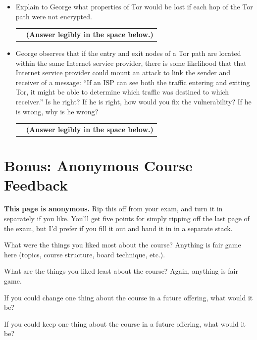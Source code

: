 \documentclass[11pt]{article}
\newcounter{pctr}
\newcommand{\ansbelow}{\probnote{Answer legibly in the space below.}}
\newcommand\prob[1]%
  {\begin{itemize}\item[]%
   \vspace{.2in}{\bf\thepctr. ~[#1~ points]:}\stepcounter{pctr}}
\newcommand\eprob{\end{itemize}}
\newcommand\probnote[1]%
  {\\\begin{tabular}{cr} \hspace{3in} & {\bf (#1)} \\ \end{tabular}}
\begin{document}
\prob{3} 
Explain to George what properties of Tor would be lost if each hop of
the Tor path were not encrypted.
\ansbelow \eprob
\vspace*{1.25in}

\newpage
\prob{4} George observes that if the entry and exit nodes of a Tor path
are located within the same Internet service provider, there is some
likelihood that that Internet service provider could mount an attack to
link the sender and receiver of a message: ``If an ISP can see both the
traffic entering and exiting Tor, it might be able to determine which
traffic was destined to which receiver.''  Is he right?  If he is right,
how would you fix the vulnerability?  If he is wrong, why is he wrong?
\ansbelow \eprob
\vspace*{1.25in}


\newpage
\section{Bonus: Anonymous Course Feedback}

{\bf This page is anonymous.}  Rip this off from your exam, and turn it
in separately if you like.  You'll get five points for simply ripping
off the last page of the exam, but I'd prefer if you fill it out and
hand it in in a separate stack.
\vspace{.5in}



What were the things you liked most about the course?  Anything is
fair game here (topics, course structure, board technique, etc.).
\vspace{1.5in}


What are the things you liked least about the course?  Again,
anything is fair game.
\vspace{1in}


If you could change one thing about the course in a future offering,
what would it be?
\vspace{1in}


If you could keep one thing about the course in a future offering,
what would it be?
\vspace{1in}


\label{lastpage}
\end{document}
